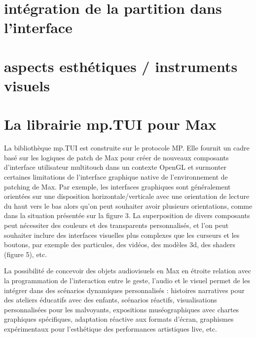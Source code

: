 \section{intégration de la partition dans l'interface}

\section{aspects esthétiques / instruments visuels}

\section{La librairie mp.TUI pour Max}

La bibliothèque mp.TUI est construite sur le protocole MP. Elle fournit un cadre basé sur les logiques de patch de Max pour créer de nouveaux composants d'interface utilisateur multitouch dans un contexte OpenGL et surmonter certaines limitations de l'interface graphique native de l'environnement de patching de Max. Par exemple, les interfaces graphiques sont généralement orientées sur une disposition horizontale/verticale avec une orientation de lecture du haut vers le bas alors qu'on peut souhaiter avoir plusieurs orientations, comme dans la situation présentée sur la figure 3. La superposition de divers composants peut nécessiter des couleurs et des transparents personnalisés, et l'on peut souhaiter inclure des interfaces visuelles plus complexes que les curseurs et les boutons, par exemple des particules, des vidéos, des modèles 3d, des shaders (figure 5), etc.

La possibilité de concevoir des objets audiovisuels en Max en étroite relation avec la programmation de l'interaction entre le geste, l'audio et le visuel permet de les intégrer dans des scénarios dynamiques personnalisés : histoires narratives pour des ateliers éducatifs avec des enfants, scénarios réactifs, visualisations personnalisées pour les malvoyants, expositions muséographiques avec chartes graphiques spécifiques, adaptation réactive aux formats d'écran, graphismes expérimentaux pour l'esthétique des performances artistiques live, etc.

